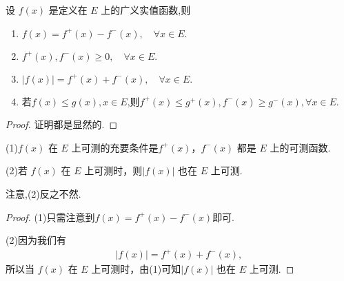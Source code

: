 \documentclass[../../main.tex]{subfiles}
\begin{document}
\begin{lemma}\label{lemma:函数的正部和负部的基本性质}
设 \(f(x)\) 是定义在 \(E\) 上的广义实值函数,则
\begin{enumerate}[(1)]
\item $f(x)=f^+(x)-f^-(x),\quad \forall x\in E.$

\item $f^+(x),f^-(x)\geqslant 0,\quad \forall x\in E.$

\item $\left| f\left( x \right) \right|=f^+\left( x \right) +f^-\left( x \right) ,\quad \forall x\in E.$

\item 若$f(x)\leqslant g(x),x\in E$,则$f^+(x)\leqslant g^+(x),f^-(x)\geqslant g^-(x),\forall x\in E.$
\end{enumerate}
\end{lemma}
\begin{proof}
证明都是显然的.
\end{proof}

\begin{theorem}
(1)\(f(x)\) 在 \(E\) 上可测的充要条件是\(f^+(x)\)，\(f^-(x)\) 都是 \(E\) 上的可测函数.

(2)若 \(f(x)\) 在 \(E\) 上可测时，则\(|f(x)|\) 也在 \(E\) 上可测.
\end{theorem}
\begin{remark}
注意,(2)反之不然.
\end{remark}
\begin{proof}
(1)只需注意到$f(x) = f^+(x) - f^-(x)$即可.

(2)因为我们有
\begin{align*}
|f(x)| = f^+(x) + f^-(x), 
\end{align*}
所以当 \(f(x)\) 在 \(E\) 上可测时，由(1)可知\(|f(x)|\) 也在 \(E\) 上可测.
\end{proof}
\end{document}
